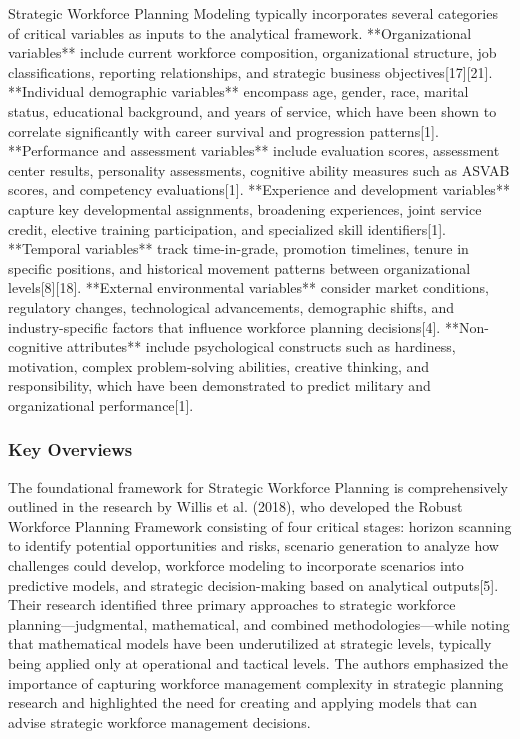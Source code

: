 \documentclass[main.tex]{subfiles}
\begin{document}
Strategic Workforce Planning Modeling typically incorporates several categories of critical variables as inputs to the analytical framework. **Organizational variables** include current workforce composition, organizational structure, job classifications, reporting relationships, and strategic business objectives[17][21]. **Individual demographic variables** encompass age, gender, race, marital status, educational background, and years of service, which have been shown to correlate significantly with career survival and progression patterns[1]. **Performance and assessment variables** include evaluation scores, assessment center results, personality assessments, cognitive ability measures such as ASVAB scores, and competency evaluations[1]. **Experience and development variables** capture key developmental assignments, broadening experiences, joint service credit, elective training participation, and specialized skill identifiers[1]. **Temporal variables** track time-in-grade, promotion timelines, tenure in specific positions, and historical movement patterns between organizational levels[8][18]. **External environmental variables** consider market conditions, regulatory changes, technological advancements, demographic shifts, and industry-specific factors that influence workforce planning decisions[4]. **Non-cognitive attributes** include psychological constructs such as hardiness, motivation, complex problem-solving abilities, creative thinking, and responsibility, which have been demonstrated to predict military and organizational performance[1].

\subsubsection{Key Overviews}

The foundational framework for Strategic Workforce Planning is comprehensively outlined in the research by Willis et al. (2018), who developed the Robust Workforce Planning Framework consisting of four critical stages: horizon scanning to identify potential opportunities and risks, scenario generation to analyze how challenges could develop, workforce modeling to incorporate scenarios into predictive models, and strategic decision-making based on analytical outputs[5]. Their research identified three primary approaches to strategic workforce planning—judgmental, mathematical, and combined methodologies—while noting that mathematical models have been underutilized at strategic levels, typically being applied only at operational and tactical levels. The authors emphasized the importance of capturing workforce management complexity in strategic planning research and highlighted the need for creating and applying models that can advise strategic workforce management decisions.
\end{document}

